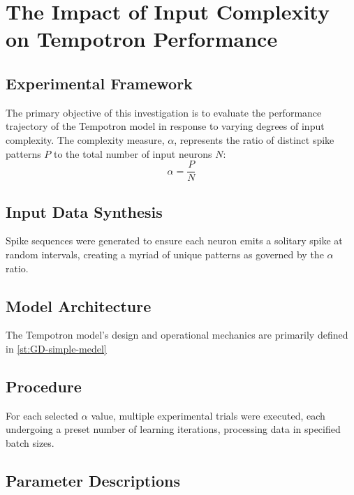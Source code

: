 
\section{The Impact of Input Complexity on Tempotron Performance}

\subsection{Experimental Framework}

The primary objective of this investigation is to evaluate the performance trajectory of the Tempotron model in response to varying degrees of input complexity. The complexity measure, \( \alpha \), represents the ratio of distinct spike patterns \( P \) to the total number of input neurons \( N \):
\[ \alpha = \frac{P}{N} \]


\subsection{Input Data Synthesis}

Spike sequences were generated to ensure each neuron emits a solitary spike at random intervals, creating a myriad of unique patterns as governed by the \( \alpha \) ratio.

\subsection{Model Architecture}

The Tempotron model's design and operational mechanics are primarily defined in \ref{st:GD-simple-medel}


\subsection{Procedure}

For each selected \( \alpha \) value, multiple experimental trials were executed, each undergoing a preset number of learning iterations, processing data in specified batch sizes.



\subsection{Parameter Descriptions}

